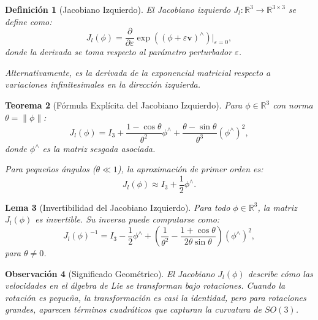 \documentclass[11pt,a4paper]{article}
\newtheorem{theorem}{Teorema}[section]
\newtheorem{definition}[theorem]{Definición}
\newtheorem{lemma}[theorem]{Lema}
\newtheorem{remark}[theorem]{Observación}
\begin{document}
\begin{definition}[Jacobiano Izquierdo]
El \emph{Jacobiano izquierdo} $J_l: \mathbb{R}^3 \to \mathbb{R}^{3 \times 3}$ se define como:
\begin{equation}
    J_l(\phi) = \frac{\partial}{\partial \varepsilon} \exp((\phi + \varepsilon \mathbf{v})^\wedge) \bigg|_{\varepsilon=0},
\end{equation}
donde la derivada se toma respecto al parámetro perturbador $\varepsilon$.

Alternativamente, es la derivada de la exponencial matricial respecto a variaciones infinitesimales en la dirección izquierda.
\end{definition}

\begin{theorem}[Fórmula Explícita del Jacobiano Izquierdo]
Para $\phi \in \mathbb{R}^3$ con norma $\theta = \|\phi\|$:
\begin{equation}
    J_l(\phi) = I_3 + \frac{1-\cos\theta}{\theta^2}\phi^\wedge + \frac{\theta - \sin\theta}{\theta^3}(\phi^\wedge)^2,
    \label{eq:J_l_formula}
\end{equation}
donde $\phi^\wedge$ es la matriz sesgada asociada.

Para pequeños ángulos ($\theta \ll 1$), la aproximación de primer orden es:
\begin{equation}
    J_l(\phi) \approx I_3 + \frac{1}{2}\phi^\wedge.
\end{equation}
\end{theorem}

\begin{lemma}[Invertibilidad del Jacobiano Izquierdo]
Para todo $\phi \in \mathbb{R}^3$, la matriz $J_l(\phi)$ es invertible. Su inversa puede computarse como:
\begin{equation}
    J_l(\phi)^{-1} = I_3 - \frac{1}{2}\phi^\wedge + \left(\frac{1}{\theta^2} - \frac{1+\cos\theta}{2\theta\sin\theta}\right)(\phi^\wedge)^2,
\end{equation}
para $\theta \neq 0$.
\end{lemma}

\begin{remark}[Significado Geométrico]
El Jacobiano $J_l(\phi)$ describe cómo las velocidades en el álgebra de Lie se transforman bajo rotaciones. Cuando la rotación es pequeña, la transformación es casi la identidad, pero para rotaciones grandes, aparecen términos cuadráticos que capturan la curvatura de $SO(3)$.
\end{remark}
\end{document}

